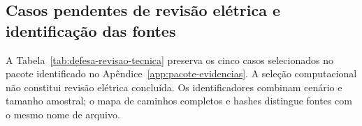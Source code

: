 \documentclass[
	12pt,				%
	openright,			%
	oneside,			%
	a4paper,			%
	chapter=TITLE,		%
	section=TITLE,		%
	subsection=TITLE,	%
	subsubsection=TITLE,%
	english,			%
	brazilian			%
	]{abntex2}
\theoremstyle{definition}
\begin{document}
\begin{apendicesenv}


\section{Casos pendentes de revisão elétrica e identificação das fontes}
\label{app:casos-revisao-pendente}

A Tabela~\ref{tab:defesa-revisao-tecnica} preserva os cinco casos
selecionados no pacote identificado no Apêndice~\ref{app:pacote-evidencias}.
A seleção computacional não constitui revisão elétrica concluída. Os
identificadores combinam cenário e tamanho amostral; o mapa de caminhos
completos e hashes distingue fontes com o mesmo nome de arquivo.



\end{apendicesenv}


	
	
	
\end{document}
